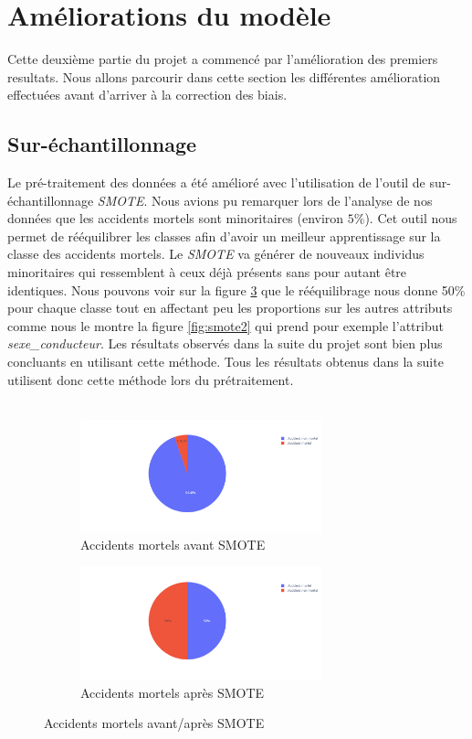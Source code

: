 \documentclass{article}
\begin{document}
    \section{Améliorations du modèle}
    Cette deuxième partie du projet a commencé par l'amélioration des premiers resultats. Nous allons parcourir 
    dans cette section les différentes amélioration effectuées avant d'arriver à la correction des biais.

    \subsection{Sur-échantillonnage}
    Le pré-traitement des données a été amélioré avec l'utilisation de l'outil de sur-échantillonnage \textit{SMOTE}.
    Nous avions pu remarquer lors de l'analyse de nos données que les accidents mortels sont minoritaires (environ $5\%$).
    Cet outil nous permet de rééquilibrer les classes afin d'avoir un meilleur apprentissage sur la classe des accidents 
    mortels. Le \textit{SMOTE} va générer de nouveaux individus minoritaires qui ressemblent à ceux déjà présents sans 
    pour autant être identiques.
    Nous pouvons voir sur la figure \ref{fig:smote1} que le rééquilibrage nous donne 50\% pour chaque classe 
    tout en affectant peu les proportions sur les autres attributs comme nous le montre la figure \ref{fig:smote2} 
    qui prend pour exemple l'attribut \textit{sexe\_conducteur}.
    Les résultats observés dans la suite du projet sont bien plus concluants en utilisant cette méthode.
    Tous les résultats obtenus dans la suite utilisent donc cette méthode lors du prétraitement.
    \\\\
    \begin{figure}[!h]
        \vspace{2cm}
        \centering
        \begin{subfigure}{7cm}
            \includegraphics[width=7cm]{./img/smote/before.png}
            \caption{Accidents mortels avant SMOTE}\label{fig:before_smote}
        \end{subfigure}
        \hspace{0.2cm}
        \begin{subfigure}{7cm}
            \includegraphics[width=7cm]{./img/smote/after.png}
        \caption{Accidents mortels après SMOTE}\label{fig:after_smote}
        \end{subfigure}
        \caption{Accidents mortels avant/après SMOTE}\label{fig:smote1}
    \end{figure}
\end{document}
